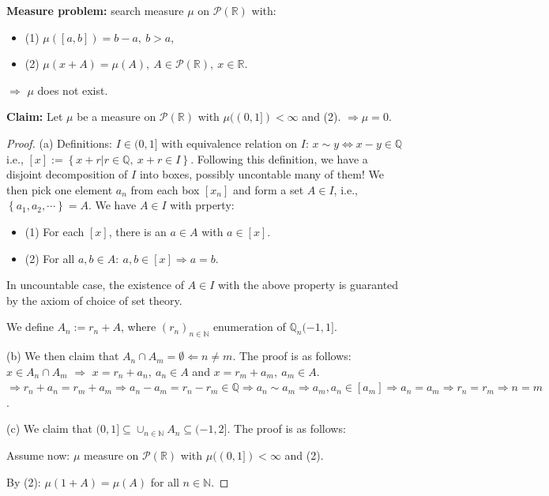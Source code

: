\documentclass[../../note.tex]{subfiles}
\begin{document}
\textbf{Measure problem:} search measure $\mu$ on $\mathcal{P}(\mathbb{R})$ with:
\begin{itemize}
    \item (1) $\mu([a, b]) = b - a,~b > a$,
    \item (2) $\mu(x+A) = \mu(A),~A \in \mathcal{P}(\mathbb{R}),~x \in \mathbb{R}$.
\end{itemize}
$\Longrightarrow$ $\mu$ does not exist.

\textbf{Claim:} Let $\mu$ be a measure on $\mathcal{P}(\mathbb{R})$ with $\mu((0, 1])<\infty$ and (2). $\Longrightarrow \mu = 0.$
\begin{proof}
    (a) Definitions: $I \in (0,1]$ with equivalence relation on $I$: $x {\sim} y \Longleftrightarrow x - y \in \mathbb{Q}$ i.e., $[x]:= \left\{x+r \vert r \in \mathbb{Q},~ x+r \in I \right\}$. Following this definition, we have a disjoint decomposition of $I$ into boxes, possibly uncontable many of them! We then pick one element $a_n$ from each box $[x_n]$ and form a set $A \in I$, i.e., $\left\{a_1, a_2, \cdots \right\} = A$. We have $A \in I$ with prperty:
    \begin{itemize}
        \item (1) For each $[x]$, there is an $a \in A$ with $a \in [x]$.
        \item (2) For all $a, b \in A:~a,b \in [x]\Longrightarrow a=b$.
    \end{itemize} 
    In uncountable case, the existence of $A \in I$ with the above property is guaranted by the axiom of choice of set theory.

    We define $A_n:= r_n + A$, where $(r_n)_{n \in \mathbb{N}}$ enumeration of $\mathbb{Q}_n(-1, 1]$. 
    
    (b) We then claim that $A_n \cap A_m = \emptyset \Longleftarrow n \neq m$. The proof is as follows: $x \in A_n \cap A_m$ $\Longrightarrow$ $x= r_n + a_n,~ a_n \in A$ and $x= r_m + a_m,~ a_m \in A$. $\Longrightarrow r_n + a_n = r_m + a_m \Longrightarrow a_n-a_m = r_n-r_m \in \mathbb{Q} \Longrightarrow a_n \sim a_m \Longrightarrow a_m, a_n \in [a_m] \Longrightarrow a_n = a_m \Longrightarrow r_n=r_m \Longrightarrow n=m$.

    (c) We claim that $(0,1] \subseteq \cup_{n \in \mathbb{N}} A_n \subseteq (-1, 2]$. The proof is as follows:

    Assume now: $\mu$ measure on $\mathcal{P}(\mathbb{R})$ with $\mu ((0,1])< \infty $ and (2).

    By (2): $\mu(1+A) = \mu(A)$ for all $n \in \mathbb{N}$.


\end{proof}
\end{document}
